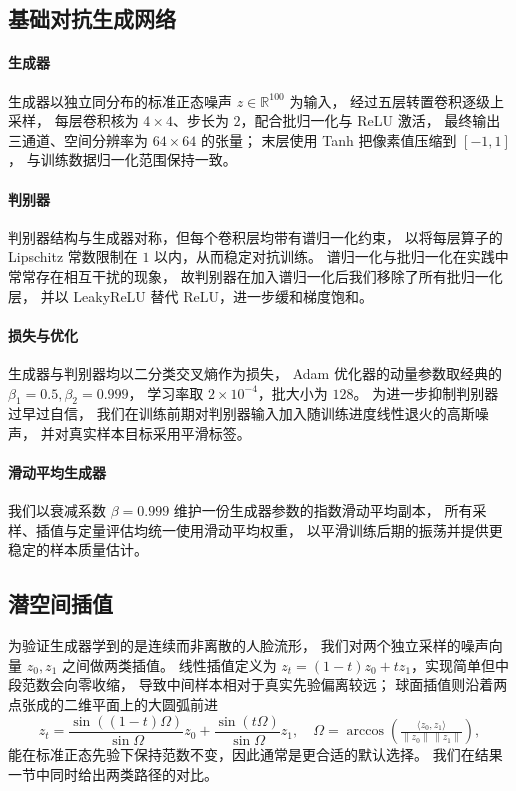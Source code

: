 \documentclass[11pt,a4paper]{ctexart}
\begin{document}
\subsection{基础对抗生成网络}
\paragraph{生成器}
生成器以独立同分布的标准正态噪声 $z\in\mathbb R^{100}$ 为输入，
经过五层转置卷积逐级上采样，
每层卷积核为 $4\times 4$、步长为 $2$，配合批归一化与 ReLU 激活，
最终输出三通道、空间分辨率为 $64\times 64$ 的张量；
末层使用 Tanh 把像素值压缩到 $[-1,1]$，
与训练数据归一化范围保持一致。
\paragraph{判别器}
判别器结构与生成器对称，但每个卷积层均带有谱归一化约束，
以将每层算子的 Lipschitz 常数限制在 $1$ 以内，从而稳定对抗训练。
谱归一化与批归一化在实践中常常存在相互干扰的现象，
故判别器在加入谱归一化后我们移除了所有批归一化层，
并以 LeakyReLU 替代 ReLU，进一步缓和梯度饱和。
\paragraph{损失与优化}
生成器与判别器均以二分类交叉熵作为损失，
Adam 优化器的动量参数取经典的 $\beta_1=0.5,\beta_2=0.999$，
学习率取 $2\times 10^{-4}$，批大小为 $128$。
为进一步抑制判别器过早过自信，
我们在训练前期对判别器输入加入随训练进度线性退火的高斯噪声，
并对真实样本目标采用平滑标签。
\paragraph{滑动平均生成器}
我们以衰减系数 $\beta=0.999$ 维护一份生成器参数的指数滑动平均副本，
所有采样、插值与定量评估均统一使用滑动平均权重，
以平滑训练后期的振荡并提供更稳定的样本质量估计。

\subsection{潜空间插值}
为验证生成器学到的是连续而非离散的人脸流形，
我们对两个独立采样的噪声向量 $z_0,z_1$ 之间做两类插值。
线性插值定义为 $z_t=(1-t)z_0+tz_1$，实现简单但中段范数会向零收缩，
导致中间样本相对于真实先验偏离较远；
球面插值则沿着两点张成的二维平面上的大圆弧前进
\begin{equation}
z_t=\frac{\sin((1-t)\Omega)}{\sin\Omega}z_0+\frac{\sin(t\Omega)}{\sin\Omega}z_1,
\quad \Omega=\arccos\!\left(\tfrac{\langle z_0,z_1\rangle}{\|z_0\|\,\|z_1\|}\right),
\end{equation}
能在标准正态先验下保持范数不变，因此通常是更合适的默认选择。
我们在结果一节中同时给出两类路径的对比。
\end{document}
